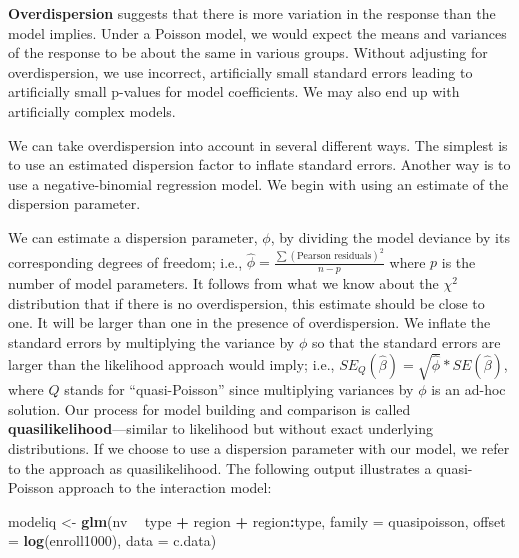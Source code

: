 \documentclass[
]{krantz}
\newenvironment{Shaded}{\begin{snugshade}}{\end{snugshade}}
\newcommand{\DataTypeTok}[1]{\textcolor[rgb]{0.27,0.27,0.27}{#1}}
\newcommand{\KeywordTok}[1]{\textcolor[rgb]{0.27,0.27,0.27}{\textbf{#1}}}
\newcommand{\NormalTok}[1]{#1}
\newcommand{\OperatorTok}[1]{\textcolor[rgb]{0.43,0.43,0.43}{\textbf{#1}}}
\newcommand{\StringTok}[1]{\textcolor[rgb]{0.5,0.5,0.5}{#1}}
\begin{document}
\textbf{Overdispersion}  suggests that there is more variation in the response than the model implies. Under a Poisson model, we would expect the means and variances of the response to be about the same in various groups. Without adjusting for overdispersion, we use incorrect, artificially small standard errors leading to artificially small p-values for model coefficients. We may also end up with artificially complex models.

We can take overdispersion into account in several different ways. The simplest is to use an estimated dispersion factor to inflate standard errors. Another way is to use a negative-binomial regression model. We begin with using an estimate of the dispersion parameter.

We can estimate a dispersion parameter, \(\phi\), by dividing the model deviance by its corresponding degrees of freedom; i.e., \(\hat\phi=\frac{\sum(\textrm{Pearson residuals})^2}{n-p}\) where \(p\) is the number of model parameters. It follows from what we know about the \(\chi^2\) distribution that if there is no overdispersion, this estimate should be close to one. It will be larger than one in the presence of overdispersion. We inflate the standard errors by multiplying the variance by \(\phi\) so that the standard errors are larger than the likelihood approach would imply; i.e., \(SE_Q(\hat\beta)=\sqrt{\hat\phi}*SE(\hat\beta)\), where \(Q\) stands for ``quasi-Poisson''  since multiplying variances by \(\phi\) is an ad-hoc solution. Our process for model building and comparison is called \textbf{quasilikelihood}---similar to likelihood but without exact underlying distributions.  If we choose to use a dispersion parameter with our model, we refer to the approach as quasilikelihood. The following output illustrates a quasi-Poisson approach to the interaction model:

\begin{Shaded}
\begin{Highlighting}[]
\NormalTok{modeliq <-}\StringTok{ }\KeywordTok{glm}\NormalTok{(nv }\OperatorTok{~}\StringTok{ }\NormalTok{type }\OperatorTok{+}\StringTok{ }\NormalTok{region }\OperatorTok{+}\StringTok{ }\NormalTok{region}\OperatorTok{:}\NormalTok{type, }
               \DataTypeTok{family =}\NormalTok{ quasipoisson,}
               \DataTypeTok{offset =} \KeywordTok{log}\NormalTok{(enroll1000), }\DataTypeTok{data =}\NormalTok{ c.data)}
\end{Highlighting}
\end{Shaded}
\end{document}
